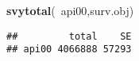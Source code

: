 \documentclass[]{article}
\newenvironment{Shaded}{\begin{snugshade}}{\end{snugshade}}
\newcommand{\KeywordTok}[1]{\textcolor[rgb]{0.13,0.29,0.53}{\textbf{{#1}}}}
\newcommand{\NormalTok}[1]{{#1}}
\begin{document}
\begin{Shaded}
\begin{Highlighting}[]
\KeywordTok{svytotal}\NormalTok{(~api00,surv.obj)}
\end{Highlighting}
\end{Shaded}

\begin{verbatim}
##         total    SE
## api00 4066888 57293
\end{verbatim}
\end{document}
